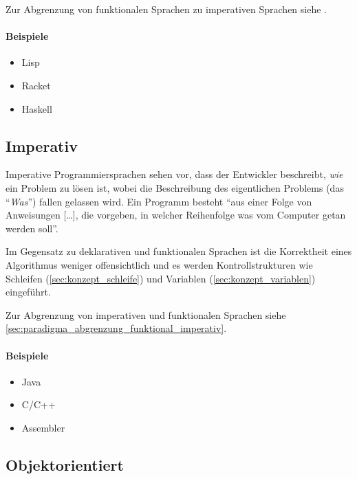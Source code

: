     Zur Abgrenzung von funktionalen Sprachen zu imperativen Sprachen siehe .
    
    \paragraph{Beispiele}
        \begin{itemize}
            \item Lisp
            \item Racket
            \item Haskell
        \end{itemize}

\subsection{Imperativ}
    \label{sec:paradigma_imperativ}

    Imperative Programmiersprachen sehen vor, dass der Entwickler beschreibt, \textit{wie} ein Problem zu lösen ist, wobei die Beschreibung des eigentlichen Problems (das \enquote{\textit{Was}}) fallen gelassen wird. Ein Programm besteht \enquote{aus einer Folge von Anweisungen [\dots], die vorgeben, in welcher Reihenfolge was vom Computer getan werden soll}. ~\cite{andreas2005grundkurs}
    
    Im Gegensatz zu deklarativen und funktionalen Sprachen ist die Korrektheit eines Algorithmus weniger offensichtlich und es werden Kontrollstrukturen wie Schleifen (\ref{sec:konzept_schleife}) und Variablen (\ref{sec:konzept_variablen}) eingeführt.
    
    Zur Abgrenzung von imperativen und funktionalen Sprachen siehe \ref{sec:paradigma_abgrenzung_funktional_imperativ}.
    
    \paragraph{Beispiele}
        \begin{itemize}
            \item Java
            \item C/C++
            \item Assembler
        \end{itemize}

\subsection{Objektorientiert}
    
